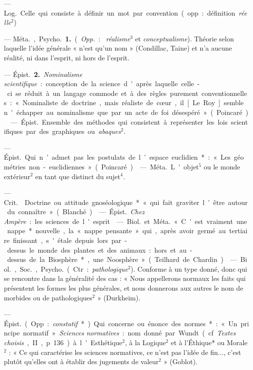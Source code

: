 \begin{itemize}[leftmargin=1cm, label=, itemsep=1pt]
 — \si{Log.} Celle qui consiste à définir un mot
par convention (opp. : définition {\it réelle}$^2$)

 —  \si{Méta.}, \si{Psycho.} {\bf 1.} ({\it Opp.} : {\it
réalisme}$^3$ et {\it conceptualisme}). Théorie selon laquelle l’idée générale
« n’est qu’un nom » (Condillac, Taine) et n'a aucune réalité, ni dans
l'esprit, ni hors de l'esprit.

— \si{Épist.} {\bf 2.} {\it Nominalisme scientifique} : conception de la
science d'après laquelle celle-ci se réduit à un langage commode et à des
règles purement conventionnelles : « Nominaliste de doctrine, mais réaliste
de cœur, il [Le Roy] semble n'échapper au nominalisme que par un acte de foi
désespéré » (Poincaré).

 — \si{Épist.} Ensemble des méthodes qui consistent à
représenter les lois scientifiques par des graphiques ou {\it abaques}$^2$.

 — \si{Épist.} Qui n’admet pas les postulats de l’espace
euclidien* : « Les géométries non-euclidiennes » (Poincaré).

 — \si{Méta.} L'objet$^5$ ou le
monde extérieur$^2$ en tant que distinct du sujet$^4$.

 — \si{Crit.}  Doctrine ou attitude
gnoséologique* « qui fait graviter l’être autour du connaître » (Blanché).

 — \si{Épist.} {\it Chez
Ampère} : les sciences de l'esprit.

 — \si{Biol.} et \si{Méta.} « C'est vraiment une nappe*
nouvelle, la « nappe pensante » qui, après avoir germé au tertiaire
finissant, s'étale depuis lors par-dessus le monde des plantes et des
animaux : hors et au-dessus de la Biosphère*, une Noosphère » (Teilhard de
Chardin).

 — \si{Biol.}, \si{Soc.}, \si{Psycho.} (Ctr. :
{\it pathologique}$^2$). Conforme à un type donné, donc qui se rencontre dans
la généralité des cas : « Nous appellerons normaux les faits qui présentent
les formes les plus générales, et nous donnerons aux autres le
nom de morbides ou de pathologiques$^2$ » (Durkheim).

 — \si{Épist.} (Opp. : {\it constatif}*) Qui concerne ou énonce
des normes*: « Un principe normatif ». {\it Sciences normatives} : nom donné
par Wundt (cf. {\it Textes choisis}, II, p. 136) à l'Esthétique$^2$, à la
Logique$^2$ et à l'Éthique* ou Morale$^2$ : « Ce qui caractérise les sciences
normatives, ce n’est pas l'idée de fin..., c’est plutôt qu’elles ont à
établir des jugements de valeur$^2$ » (Goblot).


\end{itemize}
